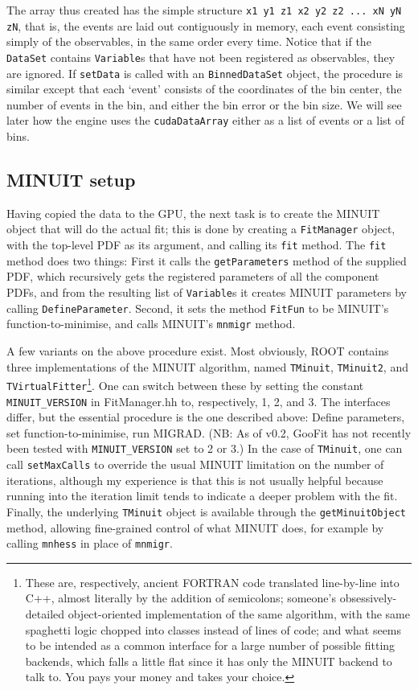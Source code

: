 \documentclass[12pt,pdflatex]{article}
\begin{document}
The array thus created has the simple structure \verb|x1 y1 z1 x2 y2 z2 ... xN yN zN|,
that is, the events are laid out contiguously in memory, each event consisting simply
of the observables, in the same order every time. Notice that if the \texttt{DataSet} contains \texttt{Variable}s
that have not been registered as observables, they are ignored. 
If \texttt{setData}
is called with an \texttt{BinnedDataSet} object, the procedure is similar
except that each `event' consists of the coordinates of the bin center, the
number of events in the bin, and either the bin error or the bin size. We will
see later how the engine uses the \texttt{cudaDataArray} either as a list
of events or a list of bins. 

\subsection{MINUIT setup} 

Having copied the data to the GPU, the next task is to create the MINUIT object
that will do the actual fit; this is done by creating a \texttt{FitManager} object,
with the top-level PDF as its argument, and calling its \texttt{fit} method. 
The \texttt{fit} method does two things: First it calls the \texttt{getParameters}
method of the supplied PDF, which recursively gets the registered parameters of
all the component PDFs, and from the resulting list of \texttt{Variable}s it creates
MINUIT parameters by calling \texttt{DefineParameter}. Second, it sets the method
\texttt{FitFun} to be MINUIT's function-to-minimise, and calls MINUIT's \texttt{mnmigr}
method. 

A few variants on the above procedure exist. Most obviously, ROOT contains three 
implementations of the MINUIT algorithm, named \texttt{TMinuit}, \texttt{TMinuit2}, 
and \texttt{TVirtualFitter}\footnote{These are, respectively, ancient FORTRAN code
translated line-by-line into C++, almost literally by the addition of semicolons; 
someone's obsessively-detailed object-oriented
implementation of the same algorithm, with the same spaghetti logic chopped into
classes instead of lines of code; and what seems to be intended as a common interface
for a large number of possible fitting backends, which falls a little flat since it
has only the MINUIT backend to talk to. You pays your money and takes your choice.}. 
One can switch between these by setting the constant 
\texttt{MINUIT\_VERSION} in FitManager.hh to, respectively, 1, 2, and 3. The interfaces differ,
but the essential procedure is the one described above: Define parameters, set
function-to-minimise, run MIGRAD. (NB: As of v0.2, GooFit has not recently been
tested with \texttt{MINUIT\_VERSION} set to 2 or 3.) In the case of \texttt{TMinuit},
one can call \texttt{setMaxCalls} to override the usual MINUIT limitation on the
number of iterations, although my experience is that this is not usually helpful
because running into the iteration limit tends to indicate a deeper problem with
the fit. Finally, the underlying \texttt{TMinuit} object is available through the
\texttt{getMinuitObject} method, allowing fine-grained control of what MINUIT does, 
for example by calling \texttt{mnhess} in place of \texttt{mnmigr}.
\end{document}
